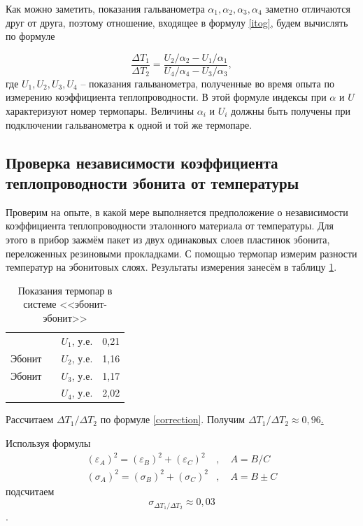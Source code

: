 \documentclass[a4paper,12pt]{article} %
\begin{document}
Как можно заметить, показания гальванометра $ \alpha_1, \alpha_2, \alpha_3, \alpha_4 $ заметно отличаются друг от друга, поэтому отношение, входящее в формулу \eqref{itog}, будем вычислять по формуле

\begin{equation}\label{correction}
\frac{\Delta T_1}{\Delta T_2} = \frac{U_2/\alpha_2-U_1/\alpha_1}{U_4/\alpha_4-U_3/\alpha_3},
\end{equation}
где $ U_1, U_2, U_3, U_4 $ -- показания гальванометра, полученные во время опыта по измерению коэффициента теплопроводности. В этой формуле индексы при $ \alpha $ и $ U $ характеризуют номер термопары. Величины $ \alpha_i $ и $ U_i $ должны быть получены при подключении гальванометра к одной и той же термопаре.

\subsection{Проверка независимости коэффициента теплопроводности эбонита от температуры}

Проверим на опыте, в какой мере выполняется предположение о независимости коэффициента теплопроводности эталонного материала от температуры. Для этого в прибор зажмём пакет из двух одинаковых слоев пластинок эбонита, переложенных резиновыми прокладками. С помощью термопар измерим разности температур на эбонитовых слоях. Результаты измерения занесём в таблицу \ref{tab:free}.

\begin{table}[H]
	\centering
	\begin{tabular}{cc|l|l|}
		\cline{3-4}
		&  & $U_1$, у.е. & 0,21 \\ \cline{1-1} \cline{3-4} 
		\multicolumn{1}{|c|}{Эбонит} &  & $U_2$, у.е. & 1,16 \\ \cline{1-1} \cline{3-4} 
		\multicolumn{1}{|c|}{Эбонит} &  & $U_3$, у.е. & 1,17 \\ \cline{1-1} \cline{3-4} 
		&  & $U_4$, у.е. & 2,02 \\ \cline{3-4} 
	\end{tabular}\caption{Показания термопар в системе <<эбонит-эбонит>>}\label{tab:free}
\end{table}

Рассчитаем $ \Delta T_1 / \Delta T_2 $ по формуле \eqref{correction}. Получим \underline{$ \Delta T_1 / \Delta T_2 \approx 0,96 $.}

Используя формулы \label{formuli}\begin{align}
(\varepsilon_A)^2 = (\varepsilon_B)^2 + (\varepsilon_C)^2&, \quad A= B/C  \\  (\sigma_A)^2=(\sigma_B)^2+(\sigma_C)^2&, \quad A=B\pm C 
\end{align}
подсчитаем \[ \sigma_{\Delta T_1 / \Delta T_2} \approx 0,03 \].
\end{document}
